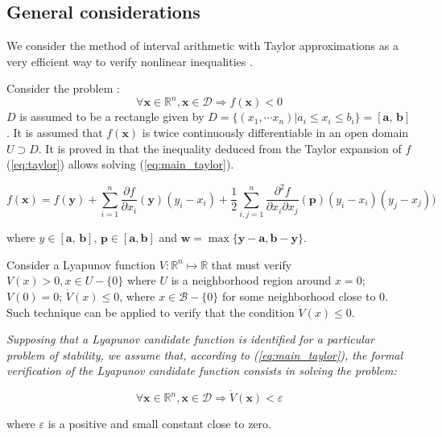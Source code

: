 \documentclass[12pt]{article}
\begin{document}
\subsection{General considerations}
We consider the method of interval arithmetic with Taylor approximations as a very efficient way to verify nonlinear inequalities \cite{solo}. 

Consider the problem :
\begin{equation}\label{eq:main_taylor}
 \forall \mathbf{x} \in \mathbb{R}^n, \mathbf{x} \in \mathcal{D} \Longrightarrow f( \mathbf{x} ) < 0
\end{equation}
\noindent
$D$ is assumed to be a rectangle given by $D = \{(x_1, \cdots x_n) | a_i \leq x_i \leq b_i \} = [\mathbf{a}, \, \mathbf{b}]$. It is assumed that $f(\mathbf{x})$ is twice continuously differentiable 
in an open domain $U \supset D$. It is proved in \cite{solo} that the inequality deduced from the Taylor expansion of $f$ (\ref{eq:taylor}) allows solving (\ref{eq:main_taylor}).


\begin{equation}\label{eq:taylor}
 f(\mathbf{x}) = f(\mathbf{y}) + \sum_{i = 1}^n \frac{\partial f}{\partial x_i} (\mathbf{y}) (y_i - x_i) + \frac{1}{2} \sum_{i,j = 1}^n \frac{\partial^2 f}{\partial x_i \partial x_j}
 (\mathbf{p}) (y_i - x_i)(y_j - x_j))
\end{equation}

\noindent
where $y \in [\mathbf{a}, \, \mathbf{b}]$, $\mathbf{p} \in [\mathbf{a}, \mathbf{b}]$ and $\mathbf{w} = \max\{ \mathbf{y} - \mathbf{a}, \mathbf{b} - \mathbf{y}  \}$.

Consider a Lyapunov function \cite{Lyap}
$V : \mathbb{R}^n \mapsto \mathbb{R}$ that must verify $V(x) > 0, x \in U - \{ 0\}$ where $U$ is a neighborhood region around $x = 0$; $V(0) = 0$; $\dot{V}(x) \leq 0$, where
$x \in \mathcal{B} - \{ 0 \}$ for some neighborhood close to 0. Such technique can be applied to verify that the condition $\dot{V}(x) \leq 0$.
{\it Supposing that a Lyapunov candidate function is identified for a particular problem of stability, we assume that, according to (\ref{eq:main_taylor}), the formal verification 
of the Lyapunov candidate function consists in solving the problem:

\begin{equation}\label{eq:main_taylor_lypa}
 \forall \mathbf{x} \in \mathbb{R}^n, \mathbf{x} \in \mathcal{D} \Longrightarrow \dot{V}( \mathbf{x} ) < \varepsilon
\end{equation}

\noindent
where $\varepsilon$ is a positive and small constant close to zero.}
\end{document}
